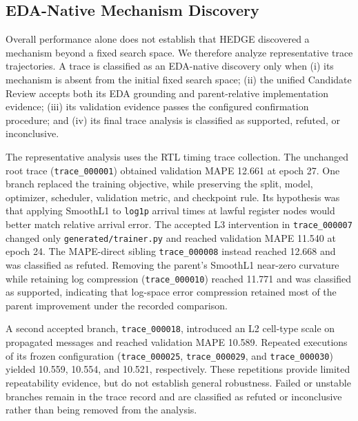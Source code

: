 \subsection{EDA-Native Mechanism Discovery}
\label{sec:mechanism_discovery}

Overall performance alone does not establish that HEDGE discovered a mechanism beyond a fixed search space. We therefore analyze representative trace trajectories. A trace is classified as an EDA-native discovery only when (i) its mechanism is absent from the initial fixed search space; (ii) the unified Candidate Review accepts both its EDA grounding and parent-relative implementation evidence; (iii) its validation evidence passes the configured confirmation procedure; and (iv) its final trace analysis is classified as supported, refuted, or inconclusive.

The representative analysis uses the RTL timing trace collection. The unchanged root trace (\texttt{trace\_000001}) obtained validation MAPE 12.661 at epoch 27. One branch replaced the training objective, while preserving the split, model, optimizer, scheduler, validation metric, and checkpoint rule. Its hypothesis was that applying SmoothL1 to \texttt{log1p} arrival times at lawful register nodes would better match relative arrival error. The accepted L3 intervention in \texttt{trace\_000007} changed only \texttt{generated/trainer.py} and reached validation MAPE 11.540 at epoch 24. The MAPE-direct sibling \texttt{trace\_000008} instead reached 12.668 and was classified as refuted. Removing the parent's SmoothL1 near-zero curvature while retaining log compression (\texttt{trace\_000010}) reached 11.771 and was classified as supported, indicating that log-space error compression retained most of the parent improvement under the recorded comparison.

A second accepted branch, \texttt{trace\_000018}, introduced an L2 cell-type scale on propagated messages and reached validation MAPE 10.589. Repeated executions of its frozen configuration (\texttt{trace\_000025}, \texttt{trace\_000029}, and \texttt{trace\_000030}) yielded 10.559, 10.554, and 10.521, respectively. These repetitions provide limited repeatability evidence, but do not establish general robustness. Failed or unstable branches remain in the trace record and are classified as refuted or inconclusive rather than being removed from the analysis.

